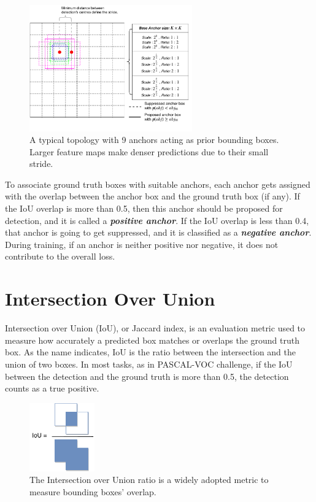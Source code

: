  \begin{figure}[!htb]
  \centering
  \includegraphics[width=7cm]{figures/ch3/fig1.pdf}
  \caption{A typical topology with 9 anchors acting as prior bounding boxes. Larger feature maps make denser predictions due to their small stride.}
  \label{ch3:fig1}
\end{figure} 

To associate ground truth boxes with suitable anchors, each anchor gets assigned with the overlap between the anchor box and the ground truth box (if any). If the IoU overlap is more than 0.5, then this anchor should be proposed for detection, and it is called a \textbf{\textit{positive anchor}}. If the IoU overlap is less than 0.4, that anchor is going to get suppressed, and it is classified as a \textbf{\textit{negative anchor}}. During training, if an anchor is neither positive nor negative, it does not contribute to the overall loss.

\section{Intersection Over Union}
Intersection over Union (IoU), or Jaccard index, is an evaluation metric used to measure how accurately a predicted box matches or overlaps the ground truth box. As the name indicates, IoU is the ratio between the intersection and the union of two boxes. In most tasks, as in PASCAL-VOC challenge, if the IoU between the detection and the ground truth is more than 0.5, the detection counts as a true positive.

\begin{figure}[!b]
  \centering
  \includegraphics[width=0.25\textwidth]{figures/ch3/fig2.pdf}
  \caption{The Intersection over Union ratio is a widely adopted metric to measure bounding boxes' overlap.}
  \label{ch3:fig2}
\end{figure} 

